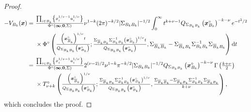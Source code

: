 \documentclass[12pt]{article}
\begin{document}
\begin{proof}
\begin{align*}
 -V_{B_k}(\bm x)  =&\ {\textstyle{\prod_{i\in B_k} \left\{ x_i^{1/\nu-1}a_i^{1/\nu}\right\}\over\Phi^\circ(\bm \infty;\bm 0, \Sigma)}} \nu^{1-k} (2\pi)^{-k/2}|\Sigma_{B_k B_k}|^{-1/2}\int_0^\infty t^{k+\nu-1} Q_{\Sigma_{B_k B_k}} \left(\bm x_{B_k}^\circ\right)^{-k-\nu} e^{-t^2/2} \\
 &\ \times \Phi^\circ \left( {\textstyle{\left(\bm x_{{\overline{B}}_k}^\circ \right)^{1/\nu} t\over Q_{\Sigma_{B_k B_k}}\left(\bm x_{B_k}^\circ\right)}}; {\textstyle{\Sigma_{{\overline{B}}_k B_k}\Sigma_{B_k B_k}^{-1}\left(\bm x_{B_k}^\circ\right)^{1/\nu}t\over Q_{\Sigma_{B_k B_k}} \left(\bm x_{B_k}^\circ\right)}},\Sigma_{{\overline{B}}_k {\overline{B}}_k}-\Sigma_{{\overline{B}}_k B_k}\Sigma_{B_k B_k}^{-1}\Sigma_{{\overline{B}}_k B_k} \right) \text dt  \\
 =&\ {\textstyle{\prod_{i\in B_k} \left\{ x_i^{1/\nu-1}a_i^{1/\nu}\right\}\over\Phi^\circ(\bm \infty;\bm 0, \Sigma)}} 2^{(\nu-2)/2} \nu^{1-k} \pi^{-k/2}|\Sigma_{B_k B_k}|^{-1/2} Q_{\Sigma_{B_k B_k}}\left(\bm x_{B_k}^\circ\right)^{-k-\nu} \Gamma\left({\textstyle{k+\nu\over2}}\right) \\  
 &\ \times T_{\nu+k}^\circ \left( {\textstyle{\left(\bm x_{{\overline{B}}_k}^\circ \right)^{1/\nu}\over Q_{\Sigma_{B_k B_k}} \left( \bm x_{B_k}^\circ \right)}}; {\textstyle{\Sigma_{{\overline{B}}_k B_k}\Sigma_{B_k B_k}^{-1}\left(\bm x_{B_k}^\circ\right)^{1/\nu}\over Q_{\Sigma_{B_k B_k}}\left(\bm x_{B_k}^\circ\right)}}, {\textstyle{\Sigma_{{\overline{B}}_k {\overline{B}}_k}-\Sigma_{{\overline{B}}_k B_k}\Sigma_{B_k B_k}^{-1}\Sigma_{{\overline{B}}_k B_k}\over k+\nu}} \right), 
 \end{align*} 
which concludes the proof.
%
\end{proof}
\end{document}
